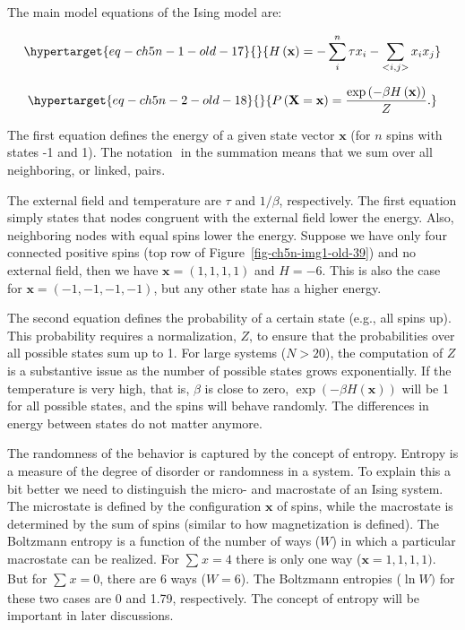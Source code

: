 \documentclass[
  a4paper,
  DIV=11,
  numbers=noendperiod,
  oneside]{scrreprt}
\begin{document}
The main model equations of the Ising model are:

\begin{equation}\protect\hypertarget{eq-ch5n-1-old-17}{}{
H\left( \mathbf{x} \right) = - \sum_{i}^{n}{\tau x_{i}} - \sum_{< i,j >}^{}{x_{i}x_{j}}}\label{eq-ch5n-1-old-17}\end{equation}

\begin{equation}\protect\hypertarget{eq-ch5n-2-old-18}{}{
P\left( \mathbf{X} = \mathbf{x} \right) = \frac{\exp\left( - \beta H\left( \mathbf{x} \right) \right)}{Z}.}\label{eq-ch5n-2-old-18}\end{equation}

The first equation defines the energy of a given state vector
\(\mathbf{x}\) (for \(n\) spins with states -1 and 1). The notation
\(< i,j >\) in the summation means that we sum over all neighboring, or
linked, pairs.

The external field and temperature are \(\tau\) and \(1/\beta\),
respectively. The first equation simply states that nodes congruent with
the external field lower the energy. Also, neighboring nodes with equal
spins lower the energy. Suppose we have only four connected positive
spins (top row of Figure~\ref{fig-ch5n-img1-old-39}) and no external
field, then we have \(\mathbf{x} = (1,1,1,1)\) and \(H = - 6\). This is
also the case for \(\mathbf{x} = ( - 1, - 1, - 1, - 1)\), but any other
state has a higher energy.

The second equation defines the probability of a certain state (e.g.,
all spins up). This probability requires a normalization, \(Z\), to
ensure that the probabilities over all possible states sum up to 1. For
large systems (\(N > 20\)), the computation of \(Z\) is a substantive
issue as the number of possible states grows exponentially. If the
temperature is very high, that is, \(\beta\) is close to zero,
\(\exp\left( - \beta H\left( \mathbf{x} \right) \right)\) will be 1 for
all possible states, and the spins will behave randomly. The differences
in energy between states do not matter anymore.

The randomness of the behavior is captured by the concept of entropy.
Entropy is a measure of the degree of disorder or randomness in a
system. To explain this a bit better we need to distinguish the micro-
and macrostate of an Ising system. The microstate is defined by the
configuration \(\mathbf{x}\) of spins, while the macrostate is
determined by the sum of spins (similar to how magnetization is
defined). The Boltzmann entropy is a function of the number of ways
(\(W\)) in which a particular macrostate can be realized. For
\(\sum_{}^{}x = 4\) there is only one way (\(\mathbf{x} = 1,1,1,1)\).
But for \(\sum_{}^{}x = 0\), there are 6 ways (\(W = 6\)). The Boltzmann
entropies (\(\ln W)\) for these two cases are 0 and 1.79, respectively.
The concept of entropy will be important in later discussions.
\end{document}
